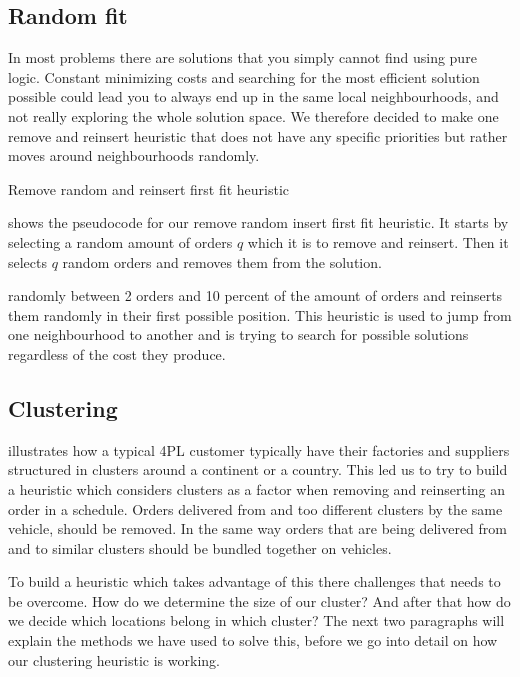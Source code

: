 \documentclass[../main.tex]{subfiles}
\begin{document}
\subsection{Random fit}
\label{sec:rand}
In most problems there are solutions that you simply cannot find using pure logic. 
Constant minimizing costs and searching for the most efficient solution possible could lead you to always end up in the same local neighbourhoods, and not really exploring the whole solution space. 
We therefore decided to make one remove and reinsert heuristic that does not have any specific priorities but rather moves around neighbourhoods randomly. 

\begin{algorithm}
    \caption{Remove random and reinsert first fit heuristic}\label{alg:rand}
    \begin{algorithmic}[1]
        $}
        \State select the number of orders to reinsert $q$
        \State solution $s' = s$
        \State remove $q$ orders from $s'$
        \State set I = removed orders
        \For{$z\in I$}
            \Repeat
            \State choose random vehicle $v$
            \State choose random position in schedule $S_v$
            \State insert $z$ in $S_v$
            \Until {feasible schedule found}
            \State update s'
        \EndFor
        \State
        \Return s'
        \EndFunction
    \end{algorithmic}
\end{algorithm}

 shows the pseudocode for our remove random insert first fit heuristic. 
It starts by selecting a random amount of orders $q$ which it is to remove and reinsert. 
Then it selects $q$ random orders and removes them from the solution. 


randomly between 2 orders and 10 percent of the amount of orders and reinserts them randomly in their first possible position. 
This heuristic is used to jump from one neighbourhood to another and is trying to search for possible solutions regardless of the cost they produce.

\subsection{Clustering}
\label{sec:clust}
 illustrates how a typical 4PL customer typically have their factories and suppliers structured in clusters around a continent or a country. 
This led us to try to build a heuristic which considers clusters as a factor when removing and reinserting an order in a schedule. 
Orders delivered from and too different clusters by the same vehicle, should be removed. 
In the same way orders that are being delivered from and to similar clusters should be bundled together on vehicles. \par
To build a heuristic which takes advantage of this there challenges that needs to be overcome. 
How do we determine the size of our cluster? 
And after that how do we decide which locations belong in which cluster? 
The next two paragraphs will explain the methods we have used to solve this, before we go into detail on how our clustering heuristic is working.
\end{document}
